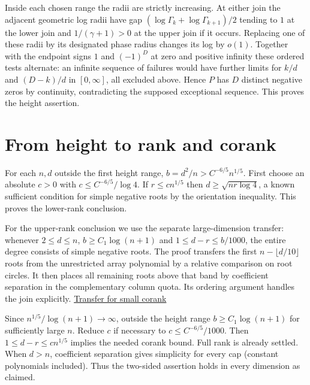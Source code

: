 Inside each chosen range the radii are strictly increasing. At either join the adjacent geometric log radii have gap $(\log\Gamma_k+\log\Gamma_{k+1})/2$ tending to $1$ at the lower join and $1/(\gamma+1)>0$ at the upper join if it occurs. Replacing one of these radii by its designated phase radius changes its log by $o(1)$. Together with the endpoint signs $1$ and $(-1)^D$ at zero and positive infinity these ordered tests alternate: an infinite sequence of failures would have further limits for $k/d$ and $(D-k)/d$ in $[0,\infty]$, all excluded above. Hence $P$ has $D$ distinct negative zeros by continuity, contradicting the supposed exceptional sequence. This proves the height assertion.

\section{From height to rank and corank}

For each $n,d$ outside the first height range, $b=d^2/n>C^{-6/5}n^{1/5}$. First choose an absolute $c>0$ with $c\le C^{-6/5}/\log 4$. If $r\le c n^{1/5}$ then $d\ge\sqrt{nr\log 4}$, a known sufficient condition for simple negative roots by the orientation inequality. This proves the lower-rank conclusion.

For the upper-rank conclusion we use the separate large-dimension transfer: whenever $2\le d\le n$, $b\ge C_1\log(n+1)$ and $1\le d-r\le b/1000$, the entire degree consists of simple negative roots. The proof transfers the first $n-\lfloor d/10\rfloor$ roots from the unrestricted array polynomial by a relative comparison on root circles. It then places all remaining roots above that band by coefficient separation in the complementary column quota. Its ordering argument handles the join explicitly. \hyperref[sec:small-corank-subquadratic]{Transfer for small corank}

Since $n^{1/5}/\log(n+1)\to\infty$, outside the height range $b\ge C_1\log(n+1)$ for sufficiently large $n$. Reduce $c$ if necessary to $c\le C^{-6/5}/1000$. Then $1\le d-r\le c n^{1/5}$ implies the needed corank bound. Full rank is already settled. When $d>n$, coefficient separation gives simplicity for every cap (constant polynomials included). Thus the two-sided assertion holds in every dimension as claimed.
